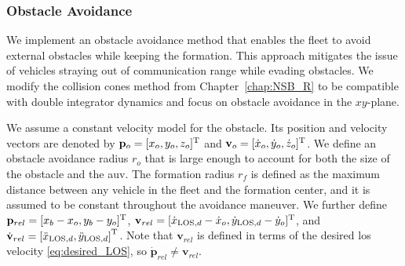 \subsubsection{Obstacle Avoidance}\label{sec:obstacle_avoidance}
We implement an obstacle avoidance method that enables the fleet to avoid external obstacles while keeping the formation. This approach mitigates the issue of vehicles straying out of communication range while evading obstacles. We modify the collision cones method from Chapter~\ref{chap:NSB_R} to be compatible with double integrator dynamics and focus on obstacle avoidance in the $xy$-plane.

We assume a constant velocity model for the obstacle. Its position and velocity vectors are denoted by $\mathbf{p}_o = [x_o, y_o, z_o]^{\mathrm{T}}$ and $\mathbf{v}_o = [\dot{x}_o, \dot{y}_o, \dot{z}_o]^{\mathrm{T}}$. We define an obstacle avoidance radius $r_o$ that is large enough to account for both the size of the obstacle and the \gls{auv}. The formation radius $r_f$ is defined as the maximum distance between any vehicle in the fleet and the formation center, and it is assumed to be constant throughout the avoidance maneuver. We further define $\mathbf{p}_{rel} = [x_b-x_o, y_b-y_o]^{\mathrm{T}}$, $\mathbf{v}_{rel} = [\dot{x}_{{\rm LOS}, d}-\dot{x}_o, \dot{y}_{{\rm LOS}, d} - \dot{y}_o ]^{\mathrm{T}}$, and $\dot{\mathbf{v}}_{rel} = \left[ \ddot{x}_{{\rm LOS}, d},  \ddot{y}_{{\rm LOS}, d}\right]^{\mathrm{T}}$. Note that $\mathbf{v}_{rel}$ is defined in terms of the desired \gls{los} velocity \eqref{eq:desired_LOS}, so $\dot{\mathbf{p}}_{rel} \neq \mathbf{v}_{rel}$.

